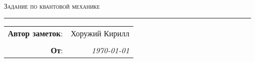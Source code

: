 
\begin{center}
    \LARGE \textsc{Задание по квантовой механике}
\end{center}

\hrule

\phantom{42}

\begin{flushright}
    \begin{tabular}{rr}
        \textbf{Автор заметок}: 
        & Хоружий Кирилл \\
        & \\
        \textbf{От}: &
        \textit{\today}\\
    \end{tabular}
\end{flushright}
\thispagestyle{empty}












\tableofcontents
\newpage